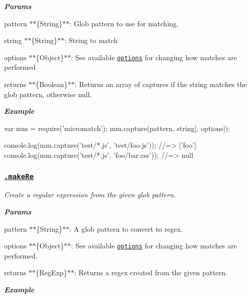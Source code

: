 {\itshape {\bfseries Params}}

{\itshape 
\begin{DoxyItemize}
\item {\ttfamily pattern} $\ast$$\ast$\{String\}$\ast$$\ast$\+: Glob pattern to use for matching.
\item {\ttfamily string} $\ast$$\ast$\{String\}$\ast$$\ast$\+: String to match
\item {\ttfamily options} $\ast$$\ast$\{Object\}$\ast$$\ast$\+: See available \href{#options}{\tt options} for changing how matches are performed
\item {\ttfamily returns} $\ast$$\ast$\{Boolean\}$\ast$$\ast$\+: Returns an array of captures if the string matches the glob pattern, otherwise {\ttfamily null}.
\end{DoxyItemize}}

{\itshape {\bfseries Example}}

{\itshape 
\begin{DoxyCode}
var mm = require('micromatch');
mm.capture(pattern, string[, options]);

console.log(mm.capture('test/*.js', 'test/foo.js'));
//=> ['foo']
console.log(mm.capture('test/*.js', 'foo/bar.css'));
//=> null
\end{DoxyCode}
}

{\itshape \subsubsection*{\href{index.js#L571}{\tt .make\+Re}}}

{\itshape }

{\itshape Create a regular expression from the given glob {\ttfamily pattern}.}

{\itshape {\bfseries Params}}

{\itshape 
\begin{DoxyItemize}
\item {\ttfamily pattern} $\ast$$\ast$\{String\}$\ast$$\ast$\+: A glob pattern to convert to regex.
\item {\ttfamily options} $\ast$$\ast$\{Object\}$\ast$$\ast$\+: See available \href{#options}{\tt options} for changing how matches are performed.
\item {\ttfamily returns} $\ast$$\ast$\{Reg\+Exp\}$\ast$$\ast$\+: Returns a regex created from the given pattern.
\end{DoxyItemize}}

{\itshape {\bfseries Example}}

